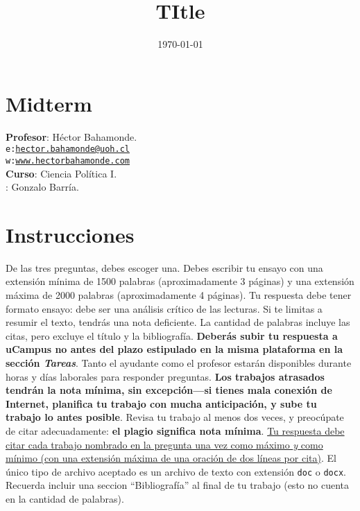 \documentclass[onesided]{article}\usepackage[]{graphicx}\usepackage[]{color}
\title{TItle} %
\date{\today}
\begin{document}










\clearpage
\newpage
{}
\setcounter{page}{1}

\section{Midterm}

{\bf Profesor}: H\'ector Bahamonde.\\
\texttt{e:}\href{mailto:hector.bahamonde@uoh.cl}{\texttt{hector.bahamonde@uoh.cl}}\\
\texttt{w:}\href{http://www.hectorbahamonde.com}{\texttt{www.hectorbahamonde.com}}\\
{\bf Curso}: Ciencia Pol\'itica I.\\
\hspace{-5mm}{\bf Ayudante}: Gonzalo Barr\'ia.

\section*{Instrucciones}
De las tres preguntas, debes escoger una. Debes escribir tu ensayo con una extensi\'on m\'inima de 1500 palabras (aproximadamente 3 p\'aginas) y una extensi\'on m\'axima de 2000 palabras (aproximadamente 4 p\'aginas). Tu respuesta debe tener formato ensayo: debe ser una an\'alisis cr\'itico de las lecturas. Si te limitas a resumir el texto, tendr\'as una nota deficiente. La cantidad de palabras incluye las citas, pero excluye el t\'itulo y la bibliograf\'ia. {\bf Deber\'as subir tu respuesta a uCampus no antes del plazo estipulado en la misma plataforma en la secci\'on \emph{Tareas}}. Tanto el ayudante como el profesor estar\'an disponibles durante horas y d\'ias laborales para responder preguntas. {\bf Los trabajos atrasados tendr\'an la nota m\'inima, sin excepci\'on---si tienes mala conexi\'on de Internet, planifica tu trabajo con mucha anticipaci\'on, y sube tu trabajo lo antes posible}. Revisa tu trabajo al menos dos veces, y preoc\'upate de citar adecuadamente: {\bf el plagio significa nota m\'inima}. \ul{Tu respuesta debe citar cada trabajo nombrado en la pregunta una vez como m\'aximo \emph{y} como m\'inimo (con una extensi\'on m\'axima de una oraci\'on de dos l\'ineas por cita)}. El \'unico tipo de archivo aceptado es un archivo de texto con extensi\'on \texttt{doc} o \texttt{docx}. Recuerda incluir una seccion ``Bibliograf\'ia'' al final de tu trabajo (esto no cuenta en la cantidad de palabras).
\end{document}
